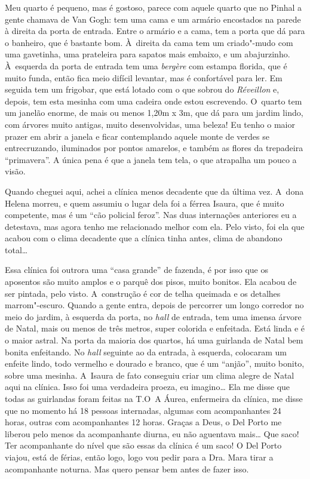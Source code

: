 Meu quarto é pequeno, mas é gostoso, parece com aquele quarto que no
Pinhal a gente chamava de Van Gogh: tem uma cama e um armário encostados
na parede à direita da porta de entrada. Entre o armário e a cama, tem a
porta que dá para o banheiro, que é bastante bom. À~direita da cama tem
um criado"-mudo com uma gavetinha, uma prateleira para sapatos mais
embaixo, e um abajurzinho. À~esquerda da porta de entrada tem uma
\emph{bergère} com estampa florida, que é muito funda, então fica meio
difícil levantar, mas é confortável para ler. Em seguida tem um
frigobar, que está lotado com o que sobrou do \emph{Réveillon} e,
depois, tem esta mesinha com uma cadeira onde estou escrevendo. O~quarto
tem um janelão enorme, de mais ou menos 1,20m x 3m, que dá para um
jardim lindo, com árvores muito antigas, muito desenvolvidas, uma
beleza! Eu tenho o maior prazer em abrir a janela e ficar contemplando
aquele monte de verdes se entrecruzando, iluminados por pontos amarelos,
e também as flores da trepadeira ``primavera''. A única pena é que a
janela tem tela, o que atrapalha um pouco a visão.

Quando cheguei aqui, achei a clínica menos decadente que da última vez.
A~dona Helena morreu, e quem assumiu o lugar dela foi a férrea Isaura,
que é muito competente, mas é um ``cão policial feroz''. Nas duas
internações anteriores eu a detestava, mas agora tenho me relacionado
melhor com ela. Pelo visto, foi ela que acabou com o clima decadente que
a clínica tinha antes, clima de abandono total…

Essa clínica foi outrora uma ``casa grande'' de fazenda, é por isso que
os aposentos são muito amplos e o parquê dos pisos, muito bonitos. Ela
acabou de ser pintada, pelo visto. A~construção é cor de telha queimada
e os detalhes marrom"-escuro. Quando a gente entra, depois de percorrer
um longo corredor no meio do jardim, à esquerda da porta, no \emph{hall}
de entrada, tem uma imensa árvore de Natal, mais ou menos de três
metros, super colorida e enfeitada. Está linda e é o maior astral. Na
porta da maioria dos quartos, há uma guirlanda de Natal bem bonita
enfeitando. No \emph{hall} seguinte ao da entrada, à esquerda, colocaram
um enfeite lindo, todo vermelho e dourado e branco, que é um ``anjão'',
muito bonito, sobre uma mesinha. A~Isaura de fato conseguiu criar um
clima alegre de Natal aqui na clínica. Isso foi uma verdadeira proeza,
eu imagino… Ela me disse que todas as guirlandas foram feitas na
T.O\,
A Áurea, enfermeira da clínica, me disse que no momento há 18 pessoas
internadas, algumas com acompanhantes 24 horas, outras com acompanhantes
12 horas. Graças a Deus, o Del Porto me liberou pelo menos da
acompanhante diurna, eu não aguentava mais… Que saco! Ter
acompanhante do nível que são essas da clínica é um saco! O Del Porto
viajou, está de férias, então logo, logo vou pedir para a Dra. Mara
tirar a acompanhante noturna. Mas quero pensar bem antes de fazer isso.

